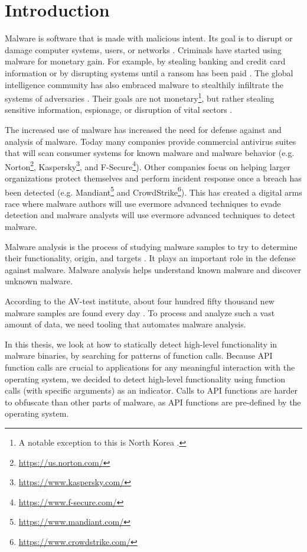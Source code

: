 \chapter{Introduction}\label{chapter:introduction}
Malware is software that is made with malicious intent. Its goal is to disrupt or damage computer systems, users, or networks \cite{microsoft-malware} \cite{practical-malware-analysis}. Criminals have started using malware for monetary gain. For example, by stealing banking and credit card information \cite{banking-malware} or by disrupting systems until a ransom has been paid \cite{ransomware}. The global intelligence community has also embraced malware to stealthily infiltrate the systems of adversaries \cite{perfect_weapon}. Their goals are not monetary\footnote{A notable exception to this is North Korea \cite{north-korea-chainalysis}.}, but rather stealing sensitive information, espionage, or disruption of vital sectors \cite{countdown-to-zero-day} \cite{sandworm}.

The increased use of malware has increased the need for defense against and analysis of malware. Today many companies provide commercial antivirus suites that will scan consumer systems for known malware and malware behavior (e.g. Norton\footnote{\tiny \url{https://us.norton.com/}}, Kaspersky\footnote{\tiny \url{https://www.kaspersky.com/}}, and F-Secure\footnote{\tiny \url{https://www.f-secure.com/}}). Other companies focus on helping larger organizations protect themselves and perform incident response once a breach has been detected (e.g. Mandiant\footnote{\tiny \url{https://www.mandiant.com/}} and CrowdStrike\footnote{\tiny \url{https://www.crowdstrike.com/}}). This has created a digital arms race where malware authors will use evermore advanced techniques to evade detection and malware analysts will use evermore advanced techniques to detect malware.

Malware analysis is the process of studying malware samples to try to determine their functionality, origin, and targets \cite{practical-malware-analysis}. It plays an important role in the defense against malware. Malware analysis helps understand known malware and discover unknown malware.

According to the AV-test institute, about four hundred fifty thousand new malware samples are found every day \cite{av-test}. To process and analyze such a vast amount of data, we need tooling that automates malware analysis.

\medskip

In this thesis, we look at how to statically detect high-level functionality in malware binaries, by searching for patterns of function calls. Because API function calls are crucial to applications for any meaningful interaction with the operating system, we decided to detect high-level functionality using function calls (with specific arguments) as an indicator. Calls to API functions are harder to obfuscate than other parts of malware, as API functions are pre-defined by the operating system.

